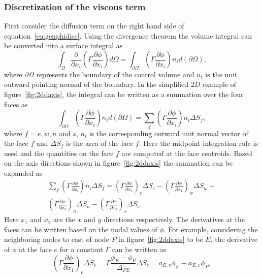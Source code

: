 \subsubsection{Discretization of the viscous term}
First consider the diffusion term on the right hand side of equation~\ref{eq:genphidisc}. Using the divergence theorem the volume integral can be converted into a surface integral as
\begin{equation}
\int_{\Omega}\frac{\partial}{\partial x_i}\left(\Gamma\frac{\partial \phi}{\partial x_i}\right) d\Omega = \int_{\partial \Omega} \left(\Gamma\frac{\partial \phi}{\partial x_i}\right) n_i d (\partial\Omega),
\end{equation}
where $\partial \Omega$ represents the boundary of the control volume and $n_i$ is the unit outward pointing normal of the boundary. In the simplified $2D$ example of figure~\ref{fig:2ddaxis}, 
the integral can be written as a summation over the four faces as
\begin{equation}
\int_{\partial \Omega} \left(\Gamma\frac{\partial \phi}{\partial x_i}\right) n_i d (\partial\Omega) = \sum_{f} \left(\Gamma\frac{\partial \phi}{\partial x_i}\right) n_i \Delta S_f,
\end{equation}
where $f=e,w,n$ and $s$, $n_i$ is the corresponding outward unit normal vector of the face $f$ and $\Delta S_f$ is the area of the face $f$. Here the midpoint integration rule is used and the quantities on the face $f$ are computed at the face centroids. Based on the axis directions shown in figure~\ref{fig:2ddaxis} the summation can be expanded as
\begin{align}
\sum_{f} \left(\Gamma\frac{\partial \phi}{\partial x_i}\right) n_i \Delta S_f = \left(\Gamma\frac{\partial \phi}{\partial x_1}\right)_e \Delta S_e - 
\left(\Gamma\frac{\partial \phi}{\partial x_1}\right)_w \Delta S_w + \nonumber \\
\left(\Gamma\frac{\partial \phi}{\partial x_2}\right)_n \Delta S_n -
\left(\Gamma\frac{\partial \phi}{\partial x_2}\right)_s \Delta S_s.
\label{eq:viscsumm}
\end{align}
Here $x_1$ and $x_2$ are the $x$ and $y$ directions respectively. The derivatives at the faces can be written based on the nodal values of $\phi$. For example, considering the neighboring nodes to east of node $P$ in figure~\ref{fig:2ddaxis} to be $E$, the derivative of $\phi$ at the face $e$ for a constant $\Gamma$ can be written as
\begin{equation}
\left(\Gamma\frac{\partial \phi}{\partial x_1}\right)_e \Delta S_e = \Gamma \frac{\phi_E-\phi_P}{\Delta_{PE}}\Delta S_e = a_{E,v}\phi_E - a_{E,v}\phi_P,
\end{equation}
